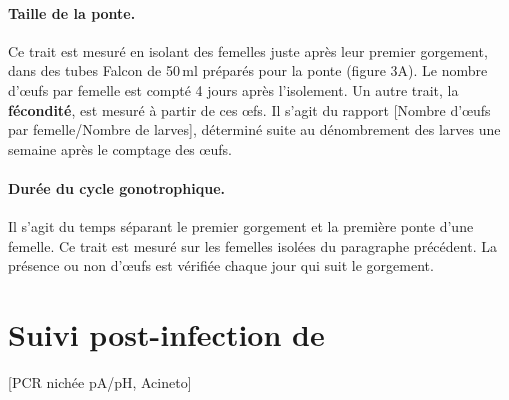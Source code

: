 \paragraph{Taille de la ponte.} Ce trait est mesuré en isolant des femelles juste après leur premier gorgement, dans des tubes Falcon de 50\,ml préparés pour la ponte (figure 3A). Le nombre d'\oe{}ufs par femelle est compté 4 jours après l'isolement.
Un autre trait, la \textbf{fécondité}, est mesuré à partir de ces \oe{}fs. Il s'agit du rapport [Nombre d'\oe{}ufs par femelle/Nombre de larves], déterminé suite au dénombrement des larves une semaine après le comptage des \oe{}ufs.

\paragraph{Durée du cycle gonotrophique.} Il s'agit du temps séparant le premier gorgement et la première ponte d'une femelle. Ce trait est mesuré sur les femelles isolées du paragraphe précédent. La présence ou non d'\oe{}ufs est vérifiée chaque jour qui suit le gorgement.

\section{Suivi post-infection de }

[PCR nichée pA/pH, Acineto]